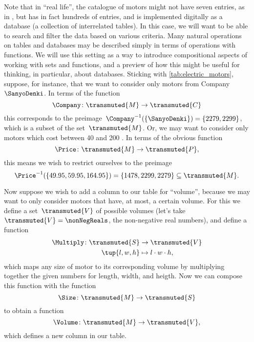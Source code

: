 Note that in ``real life'', the catalogue of motors might not have seven entries, as in \XXX, but has in fact hundreds of entries, and is implemented digitally as a database (a collection of interrelated tables).
In this case, we will want to be able to search and filter the data based on various criteria.
Many natural operations on tables and databases may be described simply in terms of operations with functions.
We will use this setting as a way to introduce compositional aspects of working with sets and functions, and a preview of how this might be useful for thinking, in particular, about databases.
Sticking with \cref{tab:electric_motors}, suppose, for instance, that we want to consider only motors from Company~$\SanyoDenki$.
In terms of the function
\begin{equation*}
    \Company\colon \transmuted{M} \to \transmuted{C}
\end{equation*}
this corresponds to the preimage~$\Company^{-1}(\{\SanyoDenki \}) = \{2279, 2299\}$, which is a subset of the set~$\transmuted{M}$.
Or, we may want to consider only motors which cost between 40 and 200 \USD.
In terms of the obvious function
\begin{equation*}
    \Price\colon \transmuted{M} \to \transmuted{P},
\end{equation*}
this means we wish to restrict ourselves to the preimage
\begin{equation*}
    \Price^{-1}(\{ 49.95, 59.95, 164.95\}) = \{ 1478, 2299, 2279 \} \subseteq \transmuted{M}.
\end{equation*}
%

Now suppose we wish to add a column to our table for ``volume'', because we may want to only consider motors that have, at most, a certain volume.
For this we define a set~$\transmuted{V}$ of possible volumes (let's take~$\transmuted{V} = \nonNegReals$, the non-negative real numbers), and define a function
\begin{equation*}
    \begin{aligned}
        \Multiply \colon \transmuted{S} & \to \transmuted{V} \\
        \tup{l, w, h}                   & \mapsto l \cdot w \cdot h,
    \end{aligned}
\end{equation*}
%
which maps any size of motor to its corresponding volume by multiplying together the given numbers for length, width, and heigth.
Now we can compose this function with the function
%
\begin{equation*}
    \Size \colon \transmuted{M} \to \transmuted{S}
\end{equation*}
%
to obtain a function
%
\begin{equation*}
    \Volume\colon \transmuted{M} \to \transmuted{V},
\end{equation*}
%
which defines a new column in our table.

